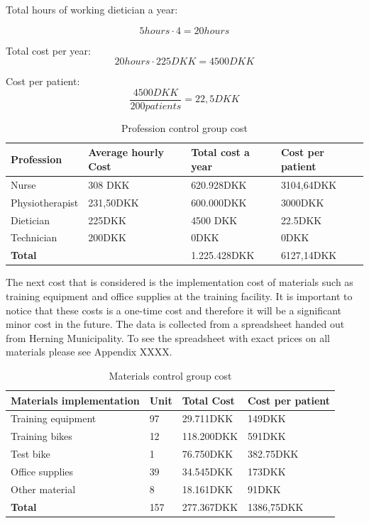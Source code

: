 Total hours of working dietician a year:

$$5hours\cdot4=20hours$$

Total cost per year:
$$20hours\cdot225DKK=4500DKK$$

Cost per patient:
$$\frac{4500DKK}{200patients}=22,5DKK$$

\begin{table}[H]
\begin{longtabu} to 
    \textbf{Profession} & \textbf{Average hourly Cost} & \textbf{Total cost a year} & \textbf{Cost per patient} \\[-1ex]
    \midrule
     Nurse   &    308 DKK & 620.928DKK & 3104,64DKK \\ \hline
    Physiotherapist   &   231,50DKK  & 600.000DKK & 3000DKK \\ \hline
    Dietician   &  225DKK &    4500 DKK    & 22.5DKK \\ \hline
    Technician & 200DKK & 0DKK & 0DKK\\
    \hline \hline \hline
    \textbf{Total} & & 1.225.428DKK & 6127,14DKK
    \newline
   \end{longtabu}
\caption{Profession control group cost}
\label{tab: PC}
\end{table}

The next cost that is considered is the implementation cost of materials such as training equipment and office supplies at the training facility. It is important to notice that these costs is a one-time cost and therefore it will be a significant minor cost in the future. The data is collected from a spreadsheet handed out from Herning Municipality. To see the spreadsheet with exact prices on all materials please see Appendix XXXX.

\begin{table}[H]
\begin{longtabu} to \linewidth{l l l l }
    \textbf{Materials implementation} & \textbf{Unit} &\textbf{Total Cost} & \textbf{Cost per patient} \\[-1ex]
    \midrule
    Training equipment   &  97 &  29.711DKK & 149DKK \\ \hline
    Training bikes   & 12 & 118.200DKK & 591DKK  \\ \hline
    Test bike    &  1 & 76.750DKK &   382.75DKK \\ \hline 
    Office supplies    &  39 & 34.545DKK  &   173DKK  \\ \hline 
    Other material   &  8 & 18.161DKK  &   91DKK\\
    \hline \hline \hline
    \textbf{Total} & 157 & 277.367DKK & 1386,75DKK
    \newline
   \end{longtabu}
\caption{Materials control group cost}
\label{tab: MC}
\end{table}

